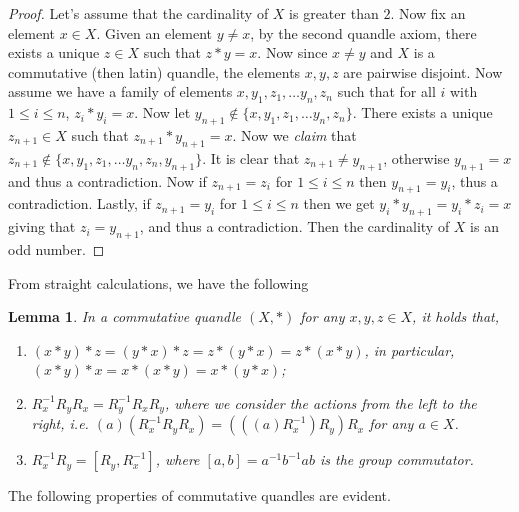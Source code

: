 \documentclass[12pt]{amsart}
\newtheorem{lemma}[thm]{Lemma}
\theoremstyle{definition}
\theoremstyle{remark}
\begin{document}
\begin{proof}
Let's assume that the cardinality of $X$ is greater than $2$.  Now fix an element  $x \in X$.  Given an element $y \neq x$, by the second quandle axiom, there exists a unique $z \in X$ such that $z*y=x$.  Now since $x \neq y$ and $X$ is a commutative (then latin) quandle, the elements $x,y,z$ are pairwise disjoint.   Now assume we have a family of elements $x, y_1, z_1, \ldots y_n, z_n$ such that for all $i$ with $1\leq i \leq n$, $z_i*y_i=x$.  Now let $y_{n+1} \not\in \{ x, y_1, z_1, \ldots y_n, z_n \} $.  There exists a unique $z_{n+1} \in X$ such that $z_{n+1} *y_{n+1} =x$.  Now we \emph{claim} that  $z_{n+1} \not\in \{ x, y_1, z_1, \ldots y_n, z_n, y_{n+1} \}.$ It is clear that $z_{n+1} \neq y_{n+1}$, otherwise $y_{n+1} =x$ and thus a contradiction.  Now if $z_{n+1} =z_i$ for $1 \leq i \leq n$ then $y_{n+1} =y_i$, thus a contradiction.  Lastly, if $z_{n+1} =y_i$ for $1 \leq i \leq n$ then we get $y_i*y_{n+1}=y_i*z_i=x$ giving that $z_i=y_{n+1}$, and thus a contradiction.   Then  the cardinality of $X$ is an odd number.
\end{proof}

From straight calculations, we have the following
\begin{lemma}
In a commutative quandle $(X, *)$ for any $x, y, z \in X$,  it holds that,
\begin{enumerate}
\item

 $(x * y) * z = (y * x) * z = z * (y * x) = z * (x * y)$, in particular, $(x * y) * x = x * (x * y) = x * (y * x)$; 
 
 \item

 $R_x^{-1} R_y R_x = R_y^{-1} R_x R_y$, where we consider the actions from the left to the right, i.e. 
$(a) (R_x^{-1} R_y R_x) = (((a) R_x^{-1}) R_y)R_x$ for any $a \in X$.

\item
 $R_x^{-1} R_y = [R_y, R_x^{-1}]$, where $[a, b] = a^{-1} b^{-1} a b$ is the group commutator. 
 \end{enumerate}
\end{lemma}



The following properties of commutative quandles are evident.
\end{document}
